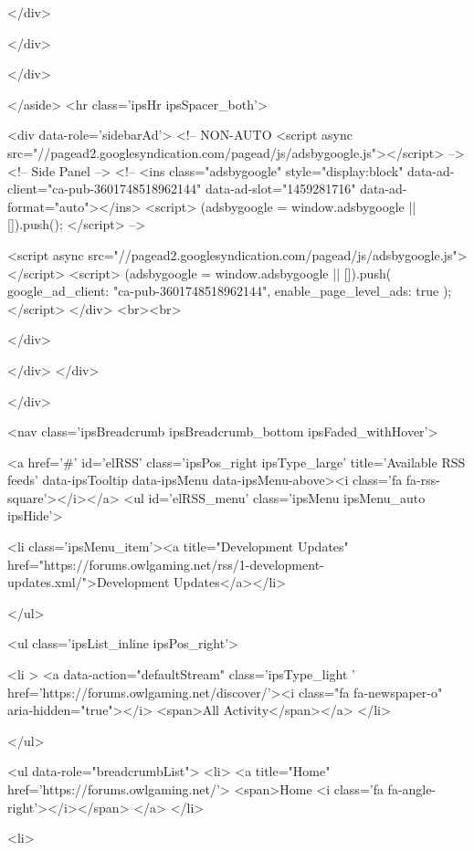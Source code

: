			</div>
		
		
	</div>
	
</div>

			</aside>
			<hr class='ipsHr ipsSpacer_both'>
		
		
			<div data-role='sidebarAd'>
				<!-- NON-AUTO
<script async src="//pagead2.googlesyndication.com/pagead/js/adsbygoogle.js"></script> 
-->
<!-- Side Panel -->
<!--
<ins class="adsbygoogle"
     style="display:block"
     data-ad-client="ca-pub-3601748518962144"
     data-ad-slot="1459281716"
     data-ad-format="auto"></ins>
<script>
(adsbygoogle = window.adsbygoogle || []).push({});
</script>
-->

<script async src="//pagead2.googlesyndication.com/pagead/js/adsbygoogle.js"></script>
<script>
     (adsbygoogle = window.adsbygoogle || []).push({
          google_ad_client: "ca-pub-3601748518962144",
          enable_page_level_ads: true
     });
</script>
			</div>
			<br><br>
		
		


	</div>

						</div>
					</div>
					
				</div>
				

				
<nav class='ipsBreadcrumb ipsBreadcrumb_bottom ipsFaded_withHover'>
	
		


	<a href='#' id='elRSS' class='ipsPos_right ipsType_large' title='Available RSS feeds' data-ipsTooltip data-ipsMenu data-ipsMenu-above><i class='fa fa-rss-square'></i></a>
	<ul id='elRSS_menu' class='ipsMenu ipsMenu_auto ipsHide'>
		
			<li class='ipsMenu_item'><a title="Development Updates" href="https://forums.owlgaming.net/rss/1-development-updates.xml/">Development Updates</a></li>
		
	</ul>

	

	<ul class='ipsList_inline ipsPos_right'>
		
		<li >
			<a data-action="defaultStream" class='ipsType_light '  href='https://forums.owlgaming.net/discover/'><i class="fa fa-newspaper-o" aria-hidden="true"></i> <span>All Activity</span></a>
		</li>
		
	</ul>

	<ul data-role="breadcrumbList">
		<li>
			<a title="Home" href='https://forums.owlgaming.net/'>
				<span>Home <i class='fa fa-angle-right'></i></span>
			</a>
		</li>
		
		
			<li>
				
